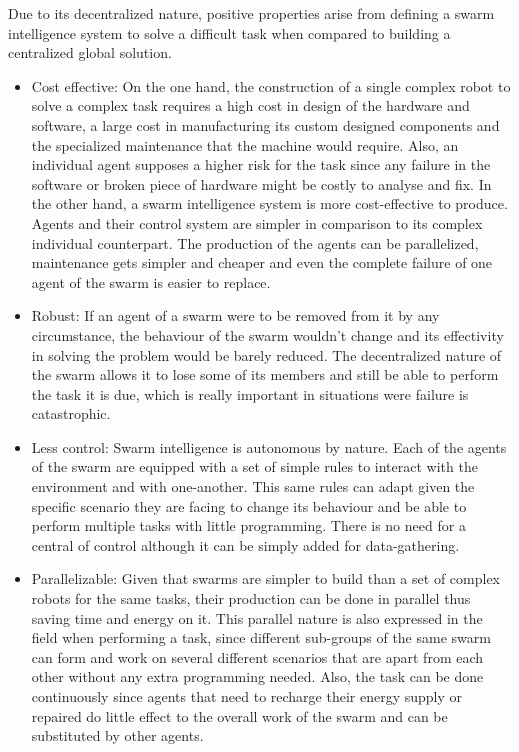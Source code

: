 Due to its decentralized nature, positive properties arise from defining a swarm intelligence system to solve a difficult task when compared to building a centralized global solution.

\begin{itemize}
\item Cost effective: On the one hand, the construction of a single complex robot to solve a complex task requires a high cost in design of the hardware and software, a large cost in manufacturing its custom designed components and the specialized maintenance that the machine would require. Also, an individual agent supposes a higher risk for the task since any failure in the software or broken piece of hardware might be costly to analyse and fix. In the other hand, a swarm intelligence system is more cost-effective to produce.  Agents and their control system are simpler in comparison to its complex individual counterpart. The production of the agents can be parallelized, maintenance gets simpler and cheaper and even the complete failure of one agent of the swarm is easier to replace.

\item Robust: If an agent of a swarm were to be removed from it by any circumstance, the behaviour of the swarm wouldn't change and its effectivity in solving the problem would be barely reduced. The decentralized nature of the swarm allows it to lose some of its members and still be able to perform the task it is due, which is really important in situations were failure is catastrophic.

\item Less control: Swarm intelligence is autonomous by nature. Each of the agents of the swarm are equipped with a set of simple rules to interact with the environment and with one-another. This same rules can adapt given the specific scenario they are facing to change its behaviour and be able to perform multiple tasks with little programming. There is no need for a central of control although it can be simply added for data-gathering.

\item Parallelizable: Given that swarms are simpler to build than a set of complex robots for the same tasks, their production can be done in parallel thus saving time and energy on it. This parallel nature is also expressed in the field when performing a task, since different sub-groups of the same swarm can form and work on several different scenarios that are apart from each other without any extra programming needed. Also, the task can be done continuously since agents that need to recharge their energy supply or repaired do little effect to the overall work of the swarm and can be substituted by other agents.
\end{itemize}


